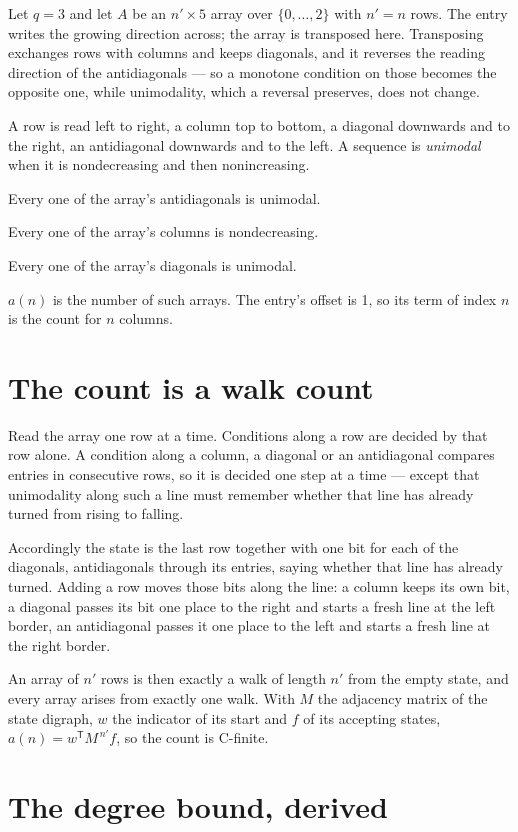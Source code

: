\documentclass[11pt]{article}
\theoremstyle{definition}
\begin{document}
Let $q = 3$ and let $A$ be an $n' \times 5$ array over $\{0,\dots,2\}$ with $n' = n$ rows. The entry writes the growing direction across; the array is transposed here. Transposing exchanges rows with columns and keeps diagonals, and it reverses the reading direction of the antidiagonals --- so a monotone condition on those becomes the opposite one, while unimodality, which a reversal preserves, does not change.

A row is read left to right, a column top to bottom, a diagonal downwards and to the right, an antidiagonal downwards and to the left. A sequence is {\itshape unimodal} when it is nondecreasing and then nonincreasing.

Every one of the array's antidiagonals is unimodal.

Every one of the array's columns is nondecreasing.

Every one of the array's diagonals is unimodal.

$a(n)$ is the number of such arrays. The entry's offset is 1, so its term of index $n$ is the count for $n$ columns.

\section{The count is a walk count}

Read the array one row at a time. Conditions along a row are decided by that row alone. A condition along a column, a diagonal or an antidiagonal compares entries in consecutive rows, so it is decided one step at a time --- except that unimodality along such a line must remember whether that line has already turned from rising to falling.

Accordingly the state is the last row together with one bit for each of the diagonals, antidiagonals through its entries, saying whether that line has already turned. Adding a row moves those bits along the line: a column keeps its own bit, a diagonal passes its bit one place to the right and starts a fresh line at the left border, an antidiagonal passes it one place to the left and starts a fresh line at the right border.

An array of $n'$ rows is then exactly a walk of length $n'$ from the empty state, and every array arises from exactly one walk. With $M$ the adjacency matrix of the state digraph, $w$ the indicator of its start and $f$ of its accepting states, $a(n) = w^{\mathsf T}M^{\,n'}f$, so the count is C-finite.

\section{The degree bound, derived}
\end{document}
